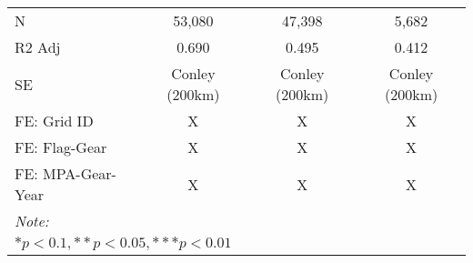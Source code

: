\begin{table}
\begin{tabular}[t]{lccc}
\hspace{1em}N & 53,080 & 47,398 & 5,682\\
\hspace{1em}R2 Adj & 0.690 & 0.495 & 0.412\\
\hspace{1em}SE & Conley (200km) & Conley (200km) & Conley (200km)\\
\midrule
FE: Grid ID & X & X & X\\
FE: Flag-Gear & X & X & X\\
FE: MPA-Gear-Year & X & X & X\\
\midrule
\bottomrule
\multicolumn{4}{l}{\rule{0pt}{1em}\textit{Note: }}\\
\multicolumn{4}{l}{\rule{0pt}{1em}$* p < 0.1, ** p < 0.05, *** p < 0.01$}\\
\end{tabular}
\end{table}